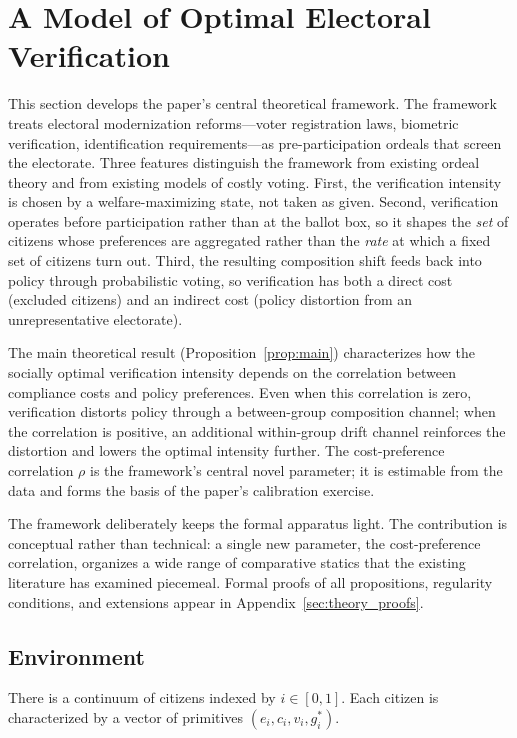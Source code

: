 \section{A Model of Optimal Electoral Verification}
\label{sec:theory}

This section develops the paper's central theoretical framework. The framework treats electoral modernization reforms---voter registration laws, biometric verification, identification requirements---as pre-participation ordeals that screen the electorate. Three features distinguish the framework from existing ordeal theory and from existing models of costly voting. First, the verification intensity is chosen by a welfare-maximizing state, not taken as given. Second, verification operates before participation rather than at the ballot box, so it shapes the \emph{set} of citizens whose preferences are aggregated rather than the \emph{rate} at which a fixed set of citizens turn out. Third, the resulting composition shift feeds back into policy through probabilistic voting, so verification has both a direct cost (excluded citizens) and an indirect cost (policy distortion from an unrepresentative electorate).

The main theoretical result (Proposition~\ref{prop:main}) characterizes how the socially optimal verification intensity depends on the correlation between compliance costs and policy preferences. Even when this correlation is zero, verification distorts policy through a between-group composition channel; when the correlation is positive, an additional within-group drift channel reinforces the distortion and lowers the optimal intensity further. The cost-preference correlation $\rho$ is the framework's central novel parameter; it is estimable from the data and forms the basis of the paper's calibration exercise.

The framework deliberately keeps the formal apparatus light. The contribution is conceptual rather than technical: a single new parameter, the cost-preference correlation, organizes a wide range of comparative statics that the existing literature has examined piecemeal. Formal proofs of all propositions, regularity conditions, and extensions appear in Appendix~\ref{sec:theory_proofs}.

\subsection{Environment}
\label{ssec:environment}

There is a continuum of citizens indexed by $i \in [0, 1]$. Each citizen is characterized by a vector of primitives $(e_i, c_i, v_i, g_i^*)$.

